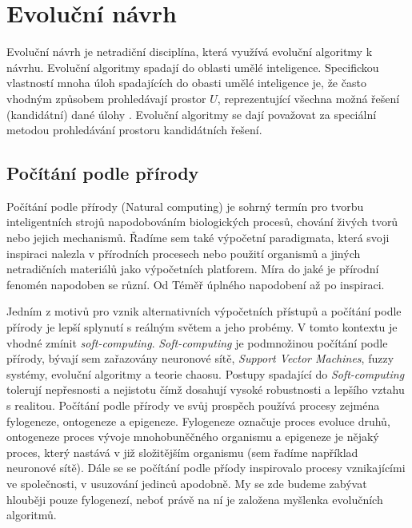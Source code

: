 \chapter{Evoluční návrh}
\label{sec:evolution_design}

Evoluční návrh je netradiční disciplína, která využívá evoluční algoritmy
k návrhu. Evoluční algoritmy spadají do oblasti umělé 
inteligence. Specifickou vlastností mnoha úloh spadajících do obasti umělé 
inteligence je, že často vhodným způsobem prohledávají prostor $U$,
reprezentující všechna možná řešení (kandidátní) dané úlohy 
\cite{evolution_hardware}. Evoluční algoritmy se dají považovat za speciální metodou 
prohledávání prostoru kandidátních řešení.

\section{Počítání podle přírody}
\label{sec:natural_computing}
Počítání podle přírody (Natural computing) je sohrný termín pro tvorbu 
inteligentních strojů napodobováním biologických procesů, chování živých 
tvorů nebo jejich mechanismů. Řadíme sem také výpočetní paradigmata, která 
svoji inspiraci nalezla v přírodních procesech nebo použití organismů a 
jiných netradičních materiálů jako výpočetních platforem. Míra do jaké je 
přírodní fenomén napodoben se různí. Od Téměř úplného napodobení až po 
inspiraci. 

Jedním z motivů pro vznik alternativních výpočetních přístupů a počítání 
podle přírody je lepší splynutí s reálným světem a jeho probémy.
V tomto kontextu je vhodné zmínit \textit{soft-computing}. \textit{Soft-computing}
je podmnožinou počítání podle přírody, bývají sem zařazovány 
neuronové sítě, \textit{Support Vector Machines}, fuzzy systémy, evoluční 
algoritmy a teorie chaosu. Postupy spadající do \textit{Soft-computing} 
tolerují nepřesnosti a nejistotu čímž dosahují vysoké robustnosti a 
lepšího vztahu s realitou. Počítání podle přírody ve svůj prospěch používá 
procesy zejména fylogeneze, ontogeneze a epigeneze. Fylogeneze označuje proces
evoluce druhů, ontogeneze proces vývoje mnohobuněčného organismu a epigeneze
je nějaký proces, který nastává v již složitějším organismu 
(sem řadíme například neuronové sítě).
Dále se se počítání podle příody inspirovalo procesy vznikajícími ve společnosti, 
v usuzování jedinců apodobně. My se zde budeme zabývat hlouběji pouze fylogenezí, neboť 
právě na ní je založena myšlenka evolučních algoritmů.

